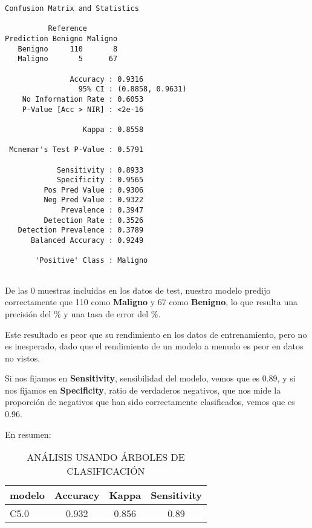 \documentclass[
]{article}
\begin{document}
\begin{verbatim}
Confusion Matrix and Statistics

          Reference
Prediction Benigno Maligno
   Benigno     110       8
   Maligno       5      67
                                          
               Accuracy : 0.9316          
                 95% CI : (0.8858, 0.9631)
    No Information Rate : 0.6053          
    P-Value [Acc > NIR] : <2e-16          
                                          
                  Kappa : 0.8558          
                                          
 Mcnemar's Test P-Value : 0.5791          
                                          
            Sensitivity : 0.8933          
            Specificity : 0.9565          
         Pos Pred Value : 0.9306          
         Neg Pred Value : 0.9322          
             Prevalence : 0.3947          
         Detection Rate : 0.3526          
   Detection Prevalence : 0.3789          
      Balanced Accuracy : 0.9249          
                                          
       'Positive' Class : Maligno         
                                          
\end{verbatim}

De las 0 muestras incluidas en los datos de test, nuestro modelo predijo
correctamente que 110 como \textbf{Maligno} y 67 como \textbf{Benigno},
lo que resulta una precisión del \% y una tasa de error del \%.

Este resultado es peor que su rendimiento en los datos de entrenamiento,
pero no es inesperado, dado que el rendimiento de un modelo a menudo es
peor en datos no vistos.

Si nos fijamos en \textbf{Sensitivity}, sensibilidad del modelo, vemos
que es 0.89, y si nos fijamos en \textbf{Specificity}, ratio de
verdaderos negativos, que nos mide la proporción de negativos que han
sido correctamente clasificados, vemos que es 0.96.

En resumen:

\begin{table}

\caption{\label{tab:unnamed-chunk-58}ANÁLISIS USANDO ÁRBOLES DE CLASIFICACIÓN}
\centering
\begin{tabular}[t]{l|c|c|c}
\hline
modelo & Accuracy & Kappa & Sensitivity\\
\hline
C5.0 & 0.932 & 0.856 & 0.89\\
\hline
\end{tabular}
\end{table}
\end{document}
